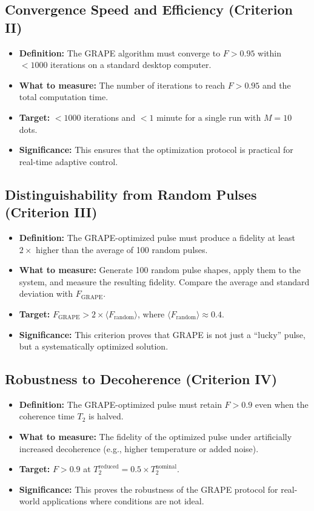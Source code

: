 \documentclass[12pt]{article}
\begin{document}
\subsection{Convergence Speed and Efficiency (Criterion II)}
\begin{itemize}
    \item \textbf{Definition:} The GRAPE algorithm must converge to $F > 0.95$ within $<1000$ iterations on a standard desktop computer.
    \item \textbf{What to measure:} The number of iterations to reach $F > 0.95$ and the total computation time.
    \item \textbf{Target:} $<1000$ iterations and $<1$ minute for a single run with $M=10$ dots.
    \item \textbf{Significance:} This ensures that the optimization protocol is practical for real-time adaptive control.
\end{itemize}

\subsection{Distinguishability from Random Pulses (Criterion III)}
\begin{itemize}
    \item \textbf{Definition:} The GRAPE-optimized pulse must produce a fidelity at least $2\times$ higher than the average of 100 random pulses.
    \item \textbf{What to measure:} Generate 100 random pulse shapes, apply them to the system, and measure the resulting fidelity. Compare the average and standard deviation with $F_{\text{GRAPE}}$.
    \item \textbf{Target:} $F_{\text{GRAPE}} > 2 \times \langle F_{\text{random}} \rangle$, where $\langle F_{\text{random}} \rangle \approx 0.4$.
    \item \textbf{Significance:} This criterion proves that GRAPE is not just a ``lucky'' pulse, but a systematically optimized solution.
\end{itemize}

\subsection{Robustness to Decoherence (Criterion IV)}
\begin{itemize}
    \item \textbf{Definition:} The GRAPE-optimized pulse must retain $F > 0.9$ even when the coherence time $T_2$ is halved.
    \item \textbf{What to measure:} The fidelity of the optimized pulse under artificially increased decoherence (e.g., higher temperature or added noise).
    \item \textbf{Target:} $F > 0.9$ at $T_2^{\text{reduced}} = 0.5 \times T_2^{\text{nominal}}$.
    \item \textbf{Significance:} This proves the robustness of the GRAPE protocol for real-world applications where conditions are not ideal.
\end{itemize}
\end{document}
